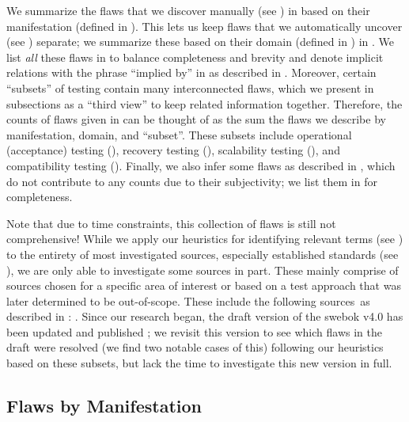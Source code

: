 We summarize the flaws that we discover manually \ifnotpaper (see
    ) \fi in  based on their
manifestation (defined in ). This lets us keep flaws that we
automatically uncover \ifnotpaper (see ) \fi separate;
we summarize these based on their domain (defined in ) in
.
\ifnotpaper We list \emph{all} these flaws in  to balance
    completeness and brevity and denote implicit relations with the phrase
    ``implied by'' in  as
    described in . \fi Moreover, certain ``subsets'' of
testing contain many interconnected flaws, which we present in subsections as a
``third view'' to keep related information together. Therefore, the counts of
flaws given in  can be thought of as the sum
the flaws we describe by manifestation, domain, and ``subset''. These subsets
include \ifnotpaper operational (acceptance) testing (), \fi
recovery testing (), scalability testing (),
and compatibility testing (). \ifnotpaper Finally, we also
    infer some flaws as described in , which do not contribute to
    any counts due to their subjectivity; we list them in 
    for completeness. \fi

Note that due to time constraints, this collection of flaws is still not
comprehensive! While we apply our heuristics for identifying relevant terms
(see ) to the entirety of most investigated sources,
especially established standards (see ), we are only able to
investigate some sources in part. These mainly comprise of sources chosen for a
specific area of interest or based on a test approach that was later determined
to be out-of-scope. These include the following sources\ifnotpaper\ as described
    in \fi: \citet{ISO2022,ISO2015,Dominguez-PumarEtAl2020,
    PierreEtAl2017,TrudnowskiEtAl2017,YuEtAl2011,Tsui2007,Goralski1999}.%
\label{swebok-update}
Since our research began, the draft version of the \acs{swebok} v4.0
\citep{SWEBOK2024} has been updated and published \citeyearpar{SWEBOK2025};
we revisit this version to see which flaws in the draft were resolved (we find
two notable cases of this) following our heuristics based on these subsets, but
lack the time to investigate this new version in full.

\subsection{Flaws by Manifestation}\label{flawMnfsts}

